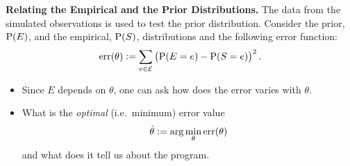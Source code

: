 \documentclass[a4paper, 10pt]{article}
\newcommand{\at}[1]{\ensuremath{\!\del{#1}}}
\newcommand{\fml}[1]{\ensuremath{{\cal #1}}}
\newcommand{\pr}[1]{\ensuremath{\mathrm{P}\at{#1}}}
\newcommand{\err}[1]{\ensuremath{\mathrm{err}\at{#1}}}
\begin{document}
\noindent\textbf{Relating the Empirical and the Prior Distributions.} The data from the simulated observations is used to test the prior distribution. Consider the prior, $\pr{E}$, and the empirical, $\pr{S}$, distributions and the following error function:
\begin{equation}
    \err{\theta} := \sum_{e\in\fml{E}} \del{\pr{E = e} - \pr{S = e}}^2.\label{eq:err.e.s}
\end{equation}

\begin{itemize}
    \item Since $E$ depends on $\theta$, one can ask how does the error varies with $\theta$.
    \item What is  the \emph{optimal} (i.e.\ minimum) error value
          \begin{equation}
              \hat{\theta} := \arg\min_\theta \err{\theta}\label{eq:opt.err}
          \end{equation}
          and what does it tell us about the program.
\end{itemize}
\end{document}
